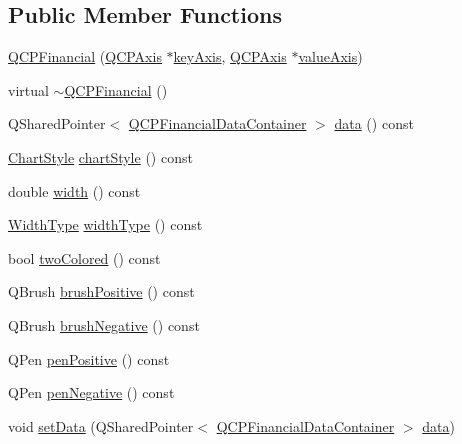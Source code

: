 \subsection*{Public Member Functions}
\begin{DoxyCompactItemize}
\item 
\hyperlink{class_q_c_p_financial_a4702d5248feeb9d1ec6e3ce725b10b32}{Q\+C\+P\+Financial} (\hyperlink{class_q_c_p_axis}{Q\+C\+P\+Axis} $\ast$\hyperlink{class_q_c_p_abstract_plottable_a2cdd6f0dd5e9a979037f86b4000d9cfe}{key\+Axis}, \hyperlink{class_q_c_p_axis}{Q\+C\+P\+Axis} $\ast$\hyperlink{class_q_c_p_abstract_plottable_af47809a644a68ffd955fb30b01fb4f2f}{value\+Axis})
\item 
virtual \hyperlink{class_q_c_p_financial_ad1fda0d793797b66819fac4682b10f31}{$\sim$\+Q\+C\+P\+Financial} ()
\item 
Q\+Shared\+Pointer$<$ \hyperlink{qcustomplot_8h_ae36e482e04f19a54782f01ab38c354a6}{Q\+C\+P\+Financial\+Data\+Container} $>$ \hyperlink{class_q_c_p_financial_aec3f666271cf48bd7b87d84fe3f8c074}{data} () const
\item 
\hyperlink{class_q_c_p_financial_a0f800e21ee98d646dfc6f8f89d10ebfb}{Chart\+Style} \hyperlink{class_q_c_p_financial_a5243371c1fde30fdae00555d7760ec2d}{chart\+Style} () const
\item 
double \hyperlink{class_q_c_p_financial_a12548f13658eda5833204ef60f524870}{width} () const
\item 
\hyperlink{class_q_c_p_financial_aef1761dda71a53dc5269685e9e492626}{Width\+Type} \hyperlink{class_q_c_p_financial_a7afa595e63800c072701e6e57d4ca9e2}{width\+Type} () const
\item 
bool \hyperlink{class_q_c_p_financial_afd4b51de5be8e53776b649f9877a50e6}{two\+Colored} () const
\item 
Q\+Brush \hyperlink{class_q_c_p_financial_ae922e75f3d5b8854369ac0bf1ebfb053}{brush\+Positive} () const
\item 
Q\+Brush \hyperlink{class_q_c_p_financial_ad4fdc5bc21f5eb17070e043bd4a35f53}{brush\+Negative} () const
\item 
Q\+Pen \hyperlink{class_q_c_p_financial_ae803fe25fdd6f0acacde4539590795ed}{pen\+Positive} () const
\item 
Q\+Pen \hyperlink{class_q_c_p_financial_a25d9a8f256e5ddcba56b6e2e7e968653}{pen\+Negative} () const
\item 
void \hyperlink{class_q_c_p_financial_a72089e75b8a50d18097526c3c79fdb85}{set\+Data} (Q\+Shared\+Pointer$<$ \hyperlink{qcustomplot_8h_ae36e482e04f19a54782f01ab38c354a6}{Q\+C\+P\+Financial\+Data\+Container} $>$ \hyperlink{class_q_c_p_financial_aec3f666271cf48bd7b87d84fe3f8c074}{data})

\end{DoxyCompactItemize}
